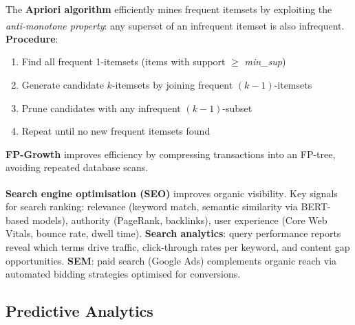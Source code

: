 \begin{tcbitemize}[ skin=sectionraster ]
    \tcbitem[title={Apriori Algorithm}, raster multicolumn=3]
    The \textbf{Apriori algorithm} efficiently mines frequent itemsets by exploiting the \emph{anti-monotone property}: any superset of an infrequent itemset is also infrequent\textsuperscript{\cite[][pp.~222--226]{leskovecMiningMassiveDatasets2014}}.
    \tcblower
    \textbf{Procedure}:
    \begin{enumerate}
        \item Find all frequent 1-itemsets (items with support $\geq$ \textit{min\_sup})
        \item Generate candidate $k$-itemsets by joining frequent $(k-1)$-itemsets
        \item Prune candidates with any infrequent $(k-1)$-subset
        \item Repeat until no new frequent itemsets found
    \end{enumerate}
    \textbf{FP-Growth} improves efficiency by compressing transactions into an FP-tree, avoiding repeated database scans.

    \tcbitem[title=SEO and Search Analytics, raster multicolumn=3]
    \textbf{Search engine optimisation (SEO)} improves organic visibility\textsuperscript{\cite[][pp.~130--136]{chaffeyDigitalBusinessECommerce2019}}.
    Key signals for search ranking: relevance (keyword match, semantic similarity via BERT-based models), authority (PageRank, backlinks), user experience (Core Web Vitals, bounce rate, dwell time).
    \textbf{Search analytics}: query performance reports reveal which terms drive traffic, click-through rates per keyword, and content gap opportunities.
    \textbf{SEM}: paid search (Google Ads) complements organic reach via automated bidding strategies optimised for conversions.

\end{tcbitemize}

\subsection{Predictive Analytics}

